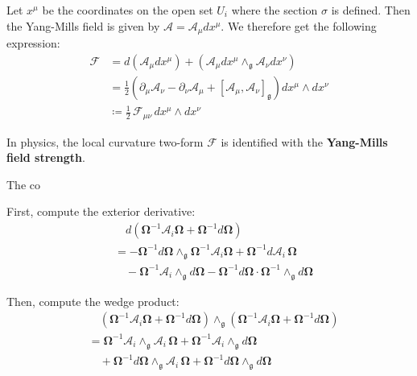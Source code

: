 Let $x^\mu$ be the coordinates on the open set $U_i$ where the section $\sigma$ is defined. Then the Yang-Mills field is given by $\mathcal{A}=\mathcal{A}_\mu dx^\mu$. We therefore get the following expression:
\begin{align*}
  \mathscr{F} &= d(\mathcal{A}_\mu dx^\mu) + (\mathcal{A}_\mu dx^\mu \wedge_\mathfrak{g} \mathcal{A}_\nu dx^\nu) \\
  &= \frac12 \left( \partial_\mu \mathcal{A}_\nu - \partial_\nu \mathcal{A}_\mu + [\mathcal{A}_\mu, \mathcal{A}_\nu]_\mathfrak{g} \right) dx^\mu \wedge dx^\nu \\
  &\coloneq \frac12 \, \mathscr{F}_{\mu\nu} \, dx^\mu \wedge dx^\nu
\end{align*}

In physics, the local curvature two-form $\mathscr{F}$ is identified with the \textbf{Yang-Mills field strength}.

The co

First, compute the exterior derivative:
\begin{align*}
  &\quad d\left( \mathbf{\Omega}^{-1} \mathbf{\mathcal{A}}_i \mathbf{\Omega} + \mathbf{\Omega}^{-1} d\mathbf{\Omega} \right) \\
  &= - \mathbf{\Omega}^{-1} d\mathbf{\Omega} \wedge_{\mathfrak{g}} \mathbf{\Omega}^{-1} \mathbf{\mathcal{A}}_i \mathbf{\Omega} 
  + \mathbf{\Omega}^{-1} d\mathbf{\mathcal{A}}_i \, \mathbf{\Omega} \\
  &\quad - \mathbf{\Omega}^{-1} \mathbf{\mathcal{A}}_i \wedge_{\mathfrak{g}} d\mathbf{\Omega} 
  - \mathbf{\Omega}^{-1} d\mathbf{\Omega} \cdot \mathbf{\Omega}^{-1} \wedge_{\mathfrak{g}} d\mathbf{\Omega}
\end{align*}

Then, compute the wedge product:
\begin{align*}
  &\quad \left( \mathbf{\Omega}^{-1} \mathbf{\mathcal{A}}_i \mathbf{\Omega} + \mathbf{\Omega}^{-1} d\mathbf{\Omega} \right) 
  \wedge_{\mathfrak{g}}
  \left( \mathbf{\Omega}^{-1} \mathbf{\mathcal{A}}_i \mathbf{\Omega} + \mathbf{\Omega}^{-1} d\mathbf{\Omega} \right) \\
  &= \mathbf{\Omega}^{-1} \mathbf{\mathcal{A}}_i \wedge_{\mathfrak{g}} \mathbf{\mathcal{A}}_i \, \mathbf{\Omega} 
  + \mathbf{\Omega}^{-1} \mathbf{\mathcal{A}}_i \wedge_{\mathfrak{g}} d\mathbf{\Omega} \\
  &\quad + \mathbf{\Omega}^{-1} d\mathbf{\Omega} \wedge_{\mathfrak{g}} \mathbf{\mathcal{A}}_i \, \mathbf{\Omega} 
  + \mathbf{\Omega}^{-1} d\mathbf{\Omega} \wedge_{\mathfrak{g}} d\mathbf{\Omega}
\end{align*}


